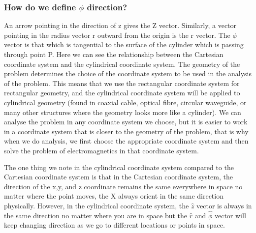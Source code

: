 \subsubsection*{ How do we define $\phi$ direction?} 
An arrow pointing in the direction of z gives the Z vector. Similarly, a vector pointing in the radius vector r outward from the origin is the r vector. The $\phi$ vector is that which is tangential to the surface of the cylinder which is passing through point P. Here we can see the relationship between the Cartesian coordinate system and the cylindrical coordinate system. The geometry of the problem determines the choice of the coordinate system to be used in the analysis of the problem. This means that we use the rectangular coordinate system for rectangular geometry, and the cylindrical coordinate system will be applied to cylindrical geometry (found in coaxial cable, optical fibre, circular waveguide, or many other structures where the geometry looks more like a cylinder).  We can analyse the problem in any coordinate system we choose, but it is easier to work in a coordinate system that is closer to the geometry of the problem, that is why when we do analysis, we first choose the appropriate coordinate system and then solve the problem of electromagnetics in that coordinate system.

The one thing we note in the cylindrical coordinate system compared to the Cartesian coordinate system is that in the Cartesian coordinate system, the direction of the x,y, and z coordinate remains the same everywhere in space no matter where the point moves, the X always orient in the same direction physically. However, in the cylindrical coordinate system, the $\hat{z}$ vector is always in the same direction no matter where you are in space but the $\hat{r}$ and $\hat{\phi}$ vector will keep changing direction as we go to different locations or points in space.

